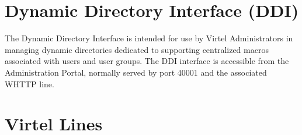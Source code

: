 \documentclass[letterpaper,10pt,english]{sphinxmanual}
\begin{document}
\begin{sphinxVerbatim}[commandchars=\\\{\}]
       
      

    
        
\end{sphinxVerbatim}

\sphinxAtStartPar
{}

\ignorespaces 

\chapter{Dynamic Directory Interface (DDI)}
\label{\detokenize{Customization:dynamic-directory-interface-ddi}}\label{\detokenize{Customization:index-48}}
\sphinxAtStartPar
The Dynamic Directory Interface is intended for use by Virtel Administrators in managing dynamic directories dedicated to supporting centralized macros associated with users and user groups. The DDI interface is accessible from the Administration Portal, normally served by port 40001 and the associated W\sphinxhyphen{}HTTP line.

\sphinxAtStartPar
{}

\sphinxAtStartPar
{}

\ignorespaces 

\chapter{Virtel Lines}
\label{\detokenize{Customization:virtel-lines}}\label{\detokenize{Customization:index-49}}
\ignorespaces 
\end{document}
